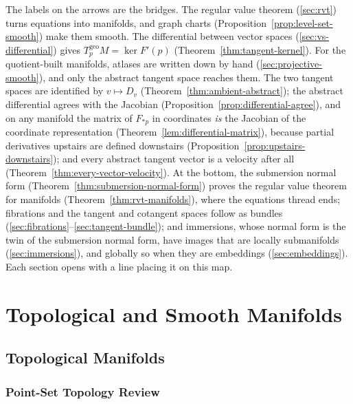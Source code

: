 \documentclass[11pt]{report}
\newcommand{\geo}{\mathrm{geo}}
\begin{document}
The labels on the arrows are the bridges. The regular value theorem (\ref{sec:rvt}) turns equations into manifolds, and graph charts (Proposition~\ref{prop:level-set-smooth}) make them smooth. The differential between vector spaces (\ref{sec:vs-differential}) gives $T^{\geo}_pM = \ker F'(p)$ (Theorem~\ref{thm:tangent-kernel}). For the quotient-built manifolds, atlases are written down by hand (\ref{sec:projective-smooth}), and only the abstract tangent space reaches them. The two tangent spaces are identified by $v \mapsto D_v$ (Theorem~\ref{thm:ambient-abstract}); the abstract differential agrees with the Jacobian (Proposition~\ref{prop:differential-agree}), and on any manifold the matrix of $F_{*p}$ in coordinates \emph{is} the Jacobian of the coordinate representation (Theorem~\ref{lem:differential-matrix}), because partial derivatives upstairs are defined downstairs (Proposition~\ref{prop:upstairs-downstairs}); and every abstract tangent vector is a velocity after all (Theorem~\ref{thm:every-vector-velocity}). At the bottom, the submersion normal form (Theorem~\ref{thm:submersion-normal-form}) proves the regular value theorem for manifolds (Theorem~\ref{thm:rvt-manifolds}), where the equations thread ends; fibrations and the tangent and cotangent spaces follow as bundles (\ref{sec:fibrations}--\ref{sec:tangent-bundle}); and immersions, whose normal form is the twin of the submersion normal form, have images that are locally submanifolds (\ref{sec:immersions}), and globally so when they are embeddings (\ref{sec:embeddings}). Each section opens with a line placing it on this map.


\part{Topological and Smooth Manifolds}

\chapter{Topological Manifolds}

\section{Point-Set Topology Review}\label{sec:review}
\end{document}
